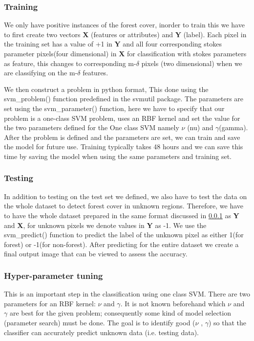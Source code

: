 \subsubsection{Training}\label{train}

We only have positive instances of the forest cover, inorder to train this we have to first create two vectors \textbf{X} (features or attributes) and \textbf{Y} (label). Each pixel in the training set has a value of +1 in \textbf{Y} and all four corresponding stokes parameter pixels(four dimensional) in \textbf{X} for classification with stokes parameters as feature, this changes to corresponding m-$\delta$ pixels (two dimensional) when we are classifying on the m-$\delta$ features. 

We then construct a problem in python format, This done using the svm\_problem() function predefined in the svmutil package. The parameters are set using the svm\_parameter() function, here we have to specify that our problem is a one-class SVM problem, uses an RBF kernel and set the value for the two parameters defined for the 
One class SVM namely $\nu$ (nu) and $\gamma$(gamma). After the problem is defined and the parameters are set, we can train and save the model for future use. Training typically takes 48 hours and we can save this time by saving the model when using the  same parameters and training set. 

\subsubsection{Testing}

In addition to testing on the test set we defined, we also have to test the data on the whole dataset to detect forest cover in unknown regions. Therefore, we have to have the whole dataset prepared in the same format discussed in \ref{train} as \textbf{Y} and \textbf{X}, for unknown pixels we denote values in \textbf{Y} as -1.
We use the svm\_predict() function to predict the label of the unknown pixel as either 1(for forest) or -1(for non-forest). After predicting for the entire dataset we create a final output image that can be viewed to assess the accuracy.

\subsubsection{Hyper-parameter tuning}

This is an important step in the classification using one class SVM. There are two parameters for an RBF kernel: $\nu$ and $\gamma$. It is not known beforehand
which $\nu$ and $\gamma$ are best for the given problem; consequently some kind of model selection (parameter search) must be done. The goal is to identify good ($\nu$ , $\gamma$) so that the classifier can accurately predict unknown data (i.e. testing data).

